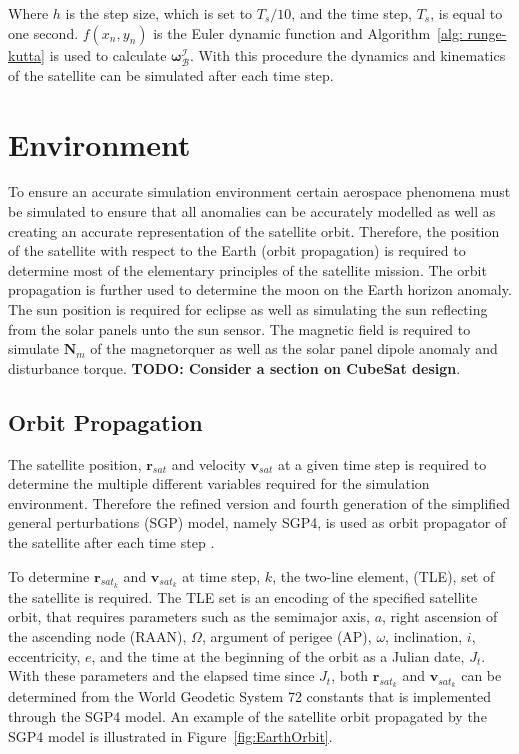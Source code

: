 Where $h$ is the step size, which is set to $T_s/10$, and the time step, $T_s$, is equal to one second. $f(x_n, y_n)$ is the Euler dynamic function and Algorithm~\ref{alg: runge-kutta} is used to calculate $\boldsymbol{\omega}_{\mathcal{B}}^{\mathcal{I}}$.  With this procedure the dynamics and kinematics of the satellite can be simulated after each time step.

\section{Environment}
To ensure an accurate simulation environment certain aerospace phenomena must be simulated to ensure that all anomalies can be accurately modelled as well as creating an accurate representation of the satellite orbit. Therefore, the position of the satellite with respect to the Earth (orbit propagation) is required to determine most of the elementary principles of the satellite mission. The orbit propagation is further used to determine the moon on the Earth horizon anomaly. The sun position is required for eclipse as well as simulating the sun reflecting from the solar panels unto the sun sensor. The magnetic field is required to simulate $\mathbf{N}_m$ of the magnetorquer as well as the solar panel dipole anomaly and disturbance torque. \textbf{TODO: Consider a section on CubeSat design}.

\subsection{Orbit Propagation}
The satellite position, $\mathbf{r}_{sat}$ and velocity $\mathbf{v}_{sat}$ at a given time step is required to determine the multiple different variables required for the simulation environment. Therefore the refined version and fourth generation of the simplified general perturbations (SGP) model, namely SGP4, is used as orbit propagator of the satellite after each time step \cite{vallado2006revisiting}. 

To determine $\mathbf{r}_{sat_k}$ and $\mathbf{v}_{sat_k}$ at time step, $k$, the two-line element, (TLE), set of the satellite is required. The TLE set is an encoding of the specified satellite orbit, that requires parameters such as the semimajor axis, $a$, right ascension of the ascending node (RAAN), $\Omega$, argument of perigee (AP), $\omega$, inclination, $i$, eccentricity, $e$, and the time at the beginning of the orbit as a Julian date, $J_t$. With these parameters and the elapsed time since $J_t$, both $\mathbf{r}_{sat_k}$ and $\mathbf{v}_{sat_k}$ can be determined from the World Geodetic System 72 constants that is implemented through the SGP4 model. An example of the satellite orbit propagated by the SGP4 model is illustrated in Figure~\ref{fig:EarthOrbit}.

